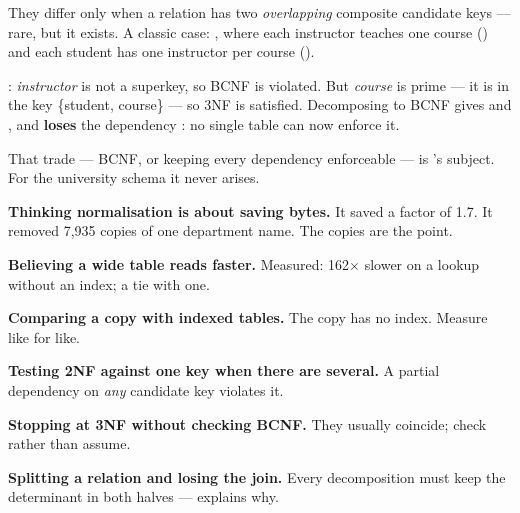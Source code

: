 \begin{conceptbox}
They differ only when a relation has two \emph{overlapping} composite
candidate keys --- rare, but it exists. A classic case:
, where each instructor teaches
one course () and each student has one instructor per
course ().

\smallskip
{}: \textit{instructor} is not a superkey, so BCNF is
violated. But \textit{course} is prime --- it is in the key \{student,
course\} --- so 3NF is satisfied. Decomposing to BCNF gives
 and , and \textbf{loses} the dependency
: no single table can now enforce it.

\smallskip
That trade --- BCNF, or keeping every dependency enforceable --- is
's subject. For the university schema it never arises.
\end{conceptbox}

\begin{pitfall}
\begin{tight}
  \item \textbf{Thinking normalisation is about saving bytes.} It saved a
        factor of 1.7. It removed 7{,}935 copies of one department name.
        The copies are the point.
  \item \textbf{Believing a wide table reads faster.} Measured: 162$\times$
        slower on a lookup without an index; a tie with one.
  \item \textbf{Comparing a  copy with indexed tables.}
        The copy has no index. Measure like for like.
  \item \textbf{Testing 2NF against one key when there are several.} A partial
        dependency on \emph{any} candidate key violates it.
  \item \textbf{Stopping at 3NF without checking BCNF.} They usually coincide;
        check rather than assume.
  \item \textbf{Splitting a relation and losing the join.} Every decomposition
        must keep the determinant in both halves --- 
        explains why.
\end{tight}
\end{pitfall}

